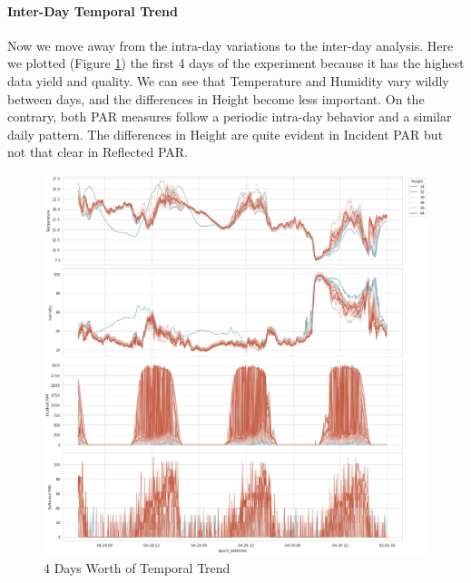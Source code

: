 \documentclass[11pt, letterpaper]{article}
\begin{document}
\paragraph{Inter-Day Temporal Trend}
Now we move away from the intra-day variations to the inter-day analysis. Here we plotted (Figure \ref{fig:ts_trend}) the first 4 days of the experiment because it has the highest data yield and quality. We can see that Temperature and Humidity vary wildly between days, and the differences in Height become less important. On the contrary, both PAR measures follow a periodic intra-day behavior and a similar daily pattern. The differences in Height are quite evident in Incident PAR but not that clear in Reflected PAR.
\begin{figure}[h!]
\centering
\includegraphics[width=1.0\textwidth]{eda_3.4.png}
\captionsetup{justification=centering}
\caption{4 Days Worth of Temporal Trend}
\label{fig:ts_trend}
\end{figure}
\end{document}
